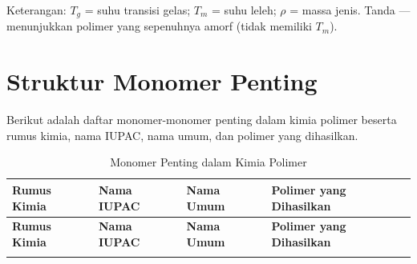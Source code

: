 \documentclass[12pt,a4paper,openany]{book}
\begin{document}
Keterangan: $T_g$ = suhu transisi gelas; $T_m$ = suhu leleh; $\rho$ = massa jenis. Tanda --- menunjukkan polimer yang sepenuhnya amorf (tidak memiliki $T_m$).

\chapter{Struktur Monomer Penting}

Berikut adalah daftar monomer-monomer penting dalam kimia polimer beserta rumus kimia, nama IUPAC, nama umum, dan polimer yang dihasilkan.

\begin{longtable}{p{3cm}p{3.5cm}p{2.5cm}p{3.5cm}}
\caption{Monomer Penting dalam Kimia Polimer} \\
\toprule
\textbf{Rumus Kimia} & \textbf{Nama IUPAC} & \textbf{Nama Umum} & \textbf{Polimer yang Dihasilkan} \\
\midrule
\endfirsthead
\toprule
\textbf{Rumus Kimia} & \textbf{Nama IUPAC} & \textbf{Nama Umum} & \textbf{Polimer yang Dihasilkan} \\
\midrule
\endhead
\bottomrule
\endfoot


\end{longtable}
\end{document}
